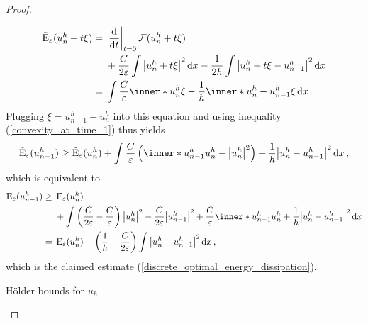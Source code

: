 \begin{proof}
\begin{description}[wide=0pt]
\begin{align*}
			\tilde{\energy}_{ \varepsilon} ( u_{ n }^{ h } + t \xi )
		={}&
		\left. \dv{ t } \right|_{ t = 0 } 
			\mathcal{ F } ( u_{ n }^{ h } + t \xi )
		\\
		{}&+ 
		\frac{ C }{ 2 \varepsilon } 
		\int 
			\abs{ u_{ n }^{ h } + t \xi }^{ 2 } 
		\dd{ x }
		-
		\frac{ 1 }{ 2h } 
		\int 
			\abs{ u_{n }^{ h } + t \xi - u_{ n - 1 }^{ h } }^{ 2 } 
		\dd{ x }
		\\
		={}& 
		\int
			\frac{ C }{ \varepsilon }
			\inner*{u_{ n }^{ h }}{\xi}
			-
			\frac{ 1 }{ h }
			\inner*{ u_{ n }^{ h } - u_{ n - 1 } ^{ h } }{ \xi }
		\dd{x}.
	\end{align*}
	Plugging $ \xi = u_{ n - 1 }^{ h } - u_{ n }^{ h } $ into this equation and using inequality (\ref{convexity_at_time_1})  thus yields
	\begin{equation*}
		\tilde{\energy}_{ \varepsilon } ( u_{ n - 1 }^{ h } ) 
		\geq
		\tilde{\energy}_{ \varepsilon} ( u_{ n }^{ h } )
		+
		\int
			\frac{ C }{ \varepsilon } 
			\left(
				\inner*{ u_{ n - 1 }^{ h } }{ u_{n }^{ h }}
				-
				\abs{ u_{ n }^{ h }}^{ 2 }
			\right)
			+
			\frac{ 1 }{ h }
			\abs{ u_{n }^{ h } - u_{ n -1 }^{ h } }^{ 2 }
		\dd{ x },
	\end{equation*}
	which is equivalent to
	\begin{align*}
		\energy_{ \varepsilon } (u_{ n - 1 }^{ h } )
		\geq {} &
		\energy_{ \varepsilon } (u_{ n }^{ h } )
		\\
		& +
		\int
			\left(
				\frac{ C }{ 2 \varepsilon }
				-
				\frac{ C }{ \varepsilon }
			\right)
			\abs{ u_{ n }^{ h } }^{ 2 }
			-
			\frac{ C }{ 2 \varepsilon }
			\abs{ u_{n - 1 }^{ h } }^{ 2 }
			+ 
			\frac{ C }{ \varepsilon }
			\inner*{ u_{ n - 1 }^{ h } }{ u_{ n }^{ h } }
			+ 
			\frac{ 1 }{ h }
			\abs{ u_{ n }^{ h } - u_{ n - 1 }^{ h } }^{ 2 }
		\dd{ x }
		\\
		= {} &
		\energy_{ \varepsilon } ( u_{n }^{ h } )
		+
		\left( 
			\frac{ 1 }{ h }
			- 
			\frac{ C }{ 2 \varepsilon }
		\right)
		\int 
			\abs{ u_{n }^{ h } - u_{ n - 1 }^{ h } }^{ 2 }
		\dd{ x },
	\end{align*}
	which is the claimed estimate (\ref{discrete_optimal_energy_dissipation}).
	
	\item[Step 4:] Hölder bounds for $ u_{ h } $
	

\end{description}
\end{proof}
